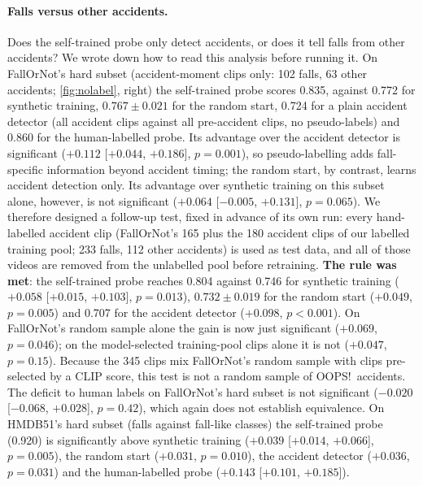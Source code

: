 \documentclass[10pt,twocolumn,letterpaper]{article}
\begin{document}
\paragraph{Falls versus other accidents.} Does the self-trained probe only detect accidents, or does it tell falls from other accidents? We wrote down how to read this analysis before running it. On FallOrNot's hard subset (accident-moment clips only: 102 falls, 63 other accidents; \cref{fig:nolabel}, right) the self-trained probe scores 0.835, against 0.772 for synthetic training, $0.767\pm0.021$ for the random start, 0.724 for a plain accident detector (all accident clips against all pre-accident clips, no pseudo-labels) and 0.860 for the human-labelled probe. Its advantage over the accident detector is significant ($+0.112$ [$+0.044$, $+0.186$], $p=0.001$), so pseudo-labelling adds fall-specific information beyond accident timing; the random start, by contrast, learns accident detection only. Its advantage over synthetic training on this subset alone, however, is not significant ($+0.064$ [$-0.005$, $+0.131$], $p=0.065$). We therefore designed a follow-up test, fixed in advance of its own run: every hand-labelled accident clip (FallOrNot's 165 plus the 180 accident clips of our labelled training pool; 233 falls, 112 other accidents) is used as test data, and all of those videos are removed from the unlabelled pool before retraining. \textbf{The rule was met}: the self-trained probe reaches 0.804 against 0.746 for synthetic training ($+0.058$ [$+0.015$, $+0.103$], $p=0.013$), $0.732\pm0.019$ for the random start ($+0.049$, $p=0.005$) and 0.707 for the accident detector ($+0.098$, $p<0.001$). On FallOrNot's random sample alone the gain is now just significant ($+0.069$, $p=0.046$); on the model-selected training-pool clips alone it is not ($+0.047$, $p=0.15$). Because the 345 clips mix FallOrNot's random sample with clips pre-selected by a CLIP score, this test is not a random sample of OOPS!\ accidents. The deficit to human labels on FallOrNot's hard subset is not significant ($-0.020$ [$-0.068$, $+0.028$], $p=0.42$), which again does not establish equivalence. On HMDB51's hard subset (falls against fall-like classes) the self-trained probe (0.920) is significantly above synthetic training ($+0.039$ [$+0.014$, $+0.066$], $p=0.005$), the random start ($+0.031$, $p=0.010$), the accident detector ($+0.036$, $p=0.031$) and the human-labelled probe ($+0.143$ [$+0.101$, $+0.185$]).
\end{document}
